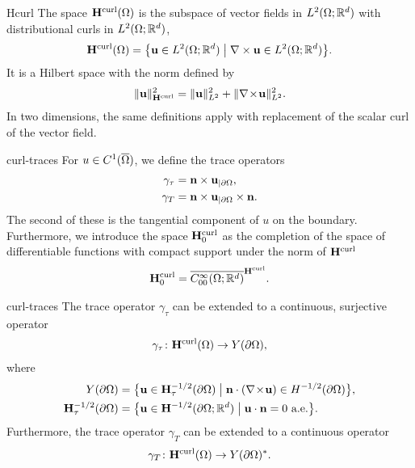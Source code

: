 \begin{Definition}{Hcurl}
  The space $\mathbf H^{\text{curl}}(\Omega)$ is the subspace of vector fields in
  $L^2(\Omega;\mathbb R^d)$ with distributional curls in $L^2(\Omega;\mathbb R^d)$,
  \begin{gather}
    \mathbf H^{\text{curl}}(\Omega) = \bigl\{ \mathbf u \in L^2(\Omega;\mathbb R^d) \; \big\vert
    \; \nabla \times \mathbf u \in L^2(\Omega;\mathbb R^d) \bigr\}.
  \end{gather}
  It is a Hilbert space with the norm defined by
  \begin{gather}
    \lVert\mathbf u\rVert_{\mathbf H^{\text{curl}}}^2 = \lVert\mathbf u\rVert_{L^2}^2 + \lVert\nabla\!\times\!\mathbf u\rVert_{L^2}^2.
  \end{gather}
  In two dimensions, the same definitions apply with replacement of
  the scalar curl of the vector field.
\end{Definition}

\begin{Definition}{curl-traces}
  For $u\in C^1(\overline{\Omega})$, we define the trace operators
  \begin{gather}
    \label{eq:maxwell:4}
    \begin{split}
      \gamma_{\tau} &= \mathbf n\times \mathbf u_{|\partial\Omega}, \\
      \gamma_{T} &= \mathbf n\times \mathbf u_{|\partial\Omega} \times \mathbf n.\\
    \end{split}
  \end{gather}
  The second of these is the tangential component of $u$ on the
  boundary. Furthermore, we introduce the space $\mathbf H^{\text{curl}}_0$ as the
  completion of the space of differentiable functions with compact
  support under the norm of $\mathbf H^{\text{curl}}$
  \begin{gather}
    \mathbf H^{\text{curl}}_0 = \overline{C^\infty_{00}(\Omega;\mathbb R^d)}^{\mathbf H^{\text{curl}}}.
  \end{gather}
\end{Definition}


\begin{Theorem}{curl-traces}
  The trace operator $\gamma_\tau$ can be extended to a continuous,
  surjective operator
  \begin{gather}
    \gamma_\tau \colon \mathbf H^{\text{curl}}(\Omega) \to Y(\partial\Omega),
  \end{gather}
  where
  \begin{gather}
    \label{eq:maxwell:5}
    \begin{split}
      Y(\partial\Omega) &= \bigl\{
      \mathbf u\in \mathbf H^{-1/2}_\tau(\partial\Omega)\; \big\vert
      \;\mathbf n\cdot(\nabla\!\times\! \mathbf u) \in H^{-1/2}(\partial\Omega) \bigr\},\\
      \mathbf H^{-1/2}_\tau(\partial\Omega) &= \bigl\{
      \mathbf u\in \mathbf H^{-1/2}(\partial\Omega;\mathbb R^d) \;\big\vert \;
      \mathbf u\cdot\mathbf n=0 \text{ a.e.}\bigr\}.
    \end{split}
  \end{gather}
  Furthermore, the trace operator $\gamma_T$ can be extended to a
  continuous operator
  \begin{gather}
    \gamma_T \colon \mathbf H^{\text{curl}}(\Omega) \to Y(\partial\Omega)^*.
  \end{gather}
\end{Theorem}



